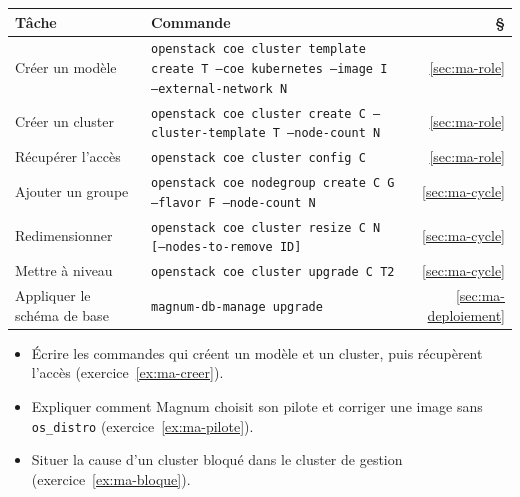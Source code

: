 \begin{center}
\renewcommand{\arraystretch}{1.35}
\begin{tabular}{@{}>{\raggedright\arraybackslash}p{3.8cm}>{\raggedright\arraybackslash}p{10.3cm}r@{}}
\toprule
\textbf{Tâche} & \textbf{Commande} & \textbf{§} \\
\midrule
Créer un modèle & \texttt{openstack coe cluster template create T --coe kubernetes --image I --external-network N} & \ref{sec:ma-role} \\
Créer un cluster & \texttt{openstack coe cluster create C --cluster-template T --node-count N} & \ref{sec:ma-role} \\
Récupérer l'accès & \texttt{openstack coe cluster config C} & \ref{sec:ma-role} \\
Ajouter un groupe & \texttt{openstack coe nodegroup create C G --flavor F --node-count N} & \ref{sec:ma-cycle} \\
Redimensionner & \texttt{openstack coe cluster resize C N [--nodes-to-remove ID]} & \ref{sec:ma-cycle} \\
Mettre à niveau & \texttt{openstack coe cluster upgrade C T2} & \ref{sec:ma-cycle} \\
Appliquer le schéma de base & \texttt{magnum-db-manage upgrade} & \ref{sec:ma-deploiement} \\
\bottomrule
\end{tabular}
\end{center}

\begin{savoirfaire}
\begin{itemize}
  \item Écrire les commandes qui créent un modèle et un cluster, puis récupèrent l'accès (exercice~\ref{ex:ma-creer}).
  \item Expliquer comment Magnum choisit son pilote et corriger une image sans \texttt{os\_distro} (exercice~\ref{ex:ma-pilote}).
  \item Situer la cause d'un cluster bloqué dans le cluster de gestion (exercice~\ref{ex:ma-bloque}).
\end{itemize}
\end{savoirfaire}
